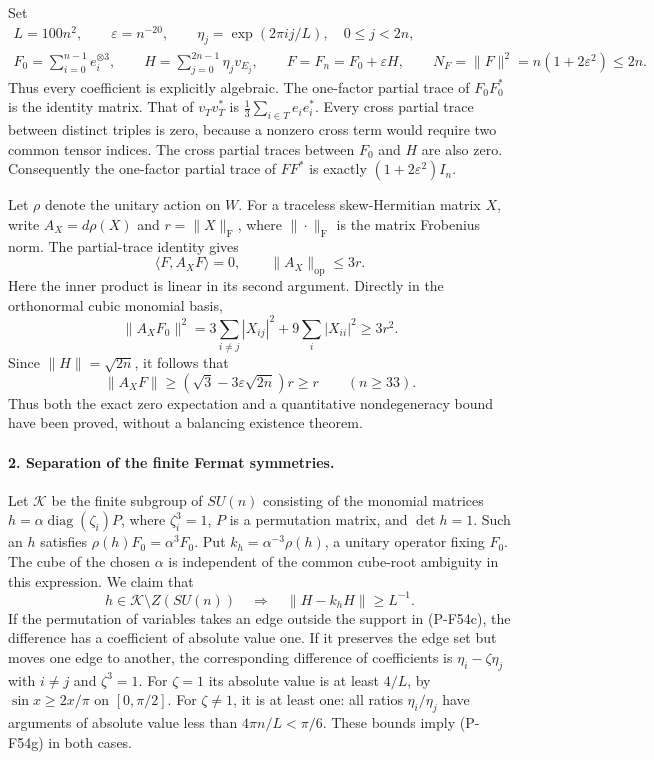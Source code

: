 Set
\[
 \begin{gathered}
 L=100n^2,\qquad \varepsilon=n^{-20},\qquad
 \eta_j=\exp(2\pi i j/L),\quad0\le j<2n,\\
 F_0=\sum_{i=0}^{n-1}e_i^{\otimes3},\qquad
 H=\sum_{j=0}^{2n-1}\eta_jv_{E_j},\qquad
 F=F_n=F_0+\varepsilon H,\qquad
 N_F=\|F\|^2=n(1+2\varepsilon^2)\le2n.
 \end{gathered}                                                   \tag{P-F54d}
\]
Thus every coefficient is explicitly algebraic. The one-factor
partial trace of $F_0F_0^*$ is the identity matrix. That of
$v_Tv_T^*$ is $\frac13\sum_{i\in T}e_ie_i^*$.
Every cross partial trace between distinct triples is zero,
because a nonzero cross term would require two common tensor
indices. The cross partial traces between $F_0$ and $H$ are
also zero. Consequently the one-factor partial trace of $FF^*$
is exactly $(1+2\varepsilon^2)I_n$.

Let $\rho$ denote the unitary action on $W$. For a traceless
skew-Hermitian matrix $X$, write $A_X=d\rho(X)$ and
$r=\|X\|_{\mathrm F}$, where $\|\cdot\|_{\mathrm F}$ is the
matrix Frobenius norm. The partial-trace identity gives
\[
       \langle F,A_XF\rangle=0,
       \qquad \|A_X\|_{\mathrm{op}}\le3r.                    \tag{P-F54e}
\]
Here the inner product is linear in its second argument.
Directly in the orthonormal cubic monomial basis,
\[
 \|A_XF_0\|^2
   =3\sum_{i\ne j}|X_{ij}|^2+9\sum_i|X_{ii}|^2
   \ge3r^2.
\]
Since $\|H\|=\sqrt{2n}$, it follows that
\[
 \|A_XF\|\ge(\sqrt3-3\varepsilon\sqrt{2n})r\ge r
                        \qquad(n\ge33).                      \tag{P-F54f}
\]
Thus both the exact zero expectation and a quantitative
nondegeneracy bound have been proved, without a balancing
existence theorem.

\paragraph{2. Separation of the finite Fermat symmetries.}
Let $\mathcal K$ be the finite subgroup of $SU(n)$ consisting of
the monomial matrices
$h=\alpha\operatorname{diag}(\zeta_i)P$, where
$\zeta_i^3=1$, $P$ is a permutation matrix, and $\det h=1$.
Such an $h$ satisfies $\rho(h)F_0=\alpha^3F_0$.
Put $k_h=\alpha^{-3}\rho(h)$, a unitary operator fixing $F_0$.
The cube of the chosen $\alpha$ is independent of the common
cube-root ambiguity in this expression.
We claim that
\[
       h\in\mathcal K\setminus Z(SU(n))
       \quad\Longrightarrow\quad
                  \|H-k_hH\|\ge L^{-1}.                     \tag{P-F54g}
\]
If the permutation of variables takes an edge outside the
support in (P-F54c), the difference has a coefficient of
absolute value one. If it preserves the edge set but moves
one edge to another, the corresponding difference of
coefficients is $\eta_i-\zeta\eta_j$ with $i\ne j$ and
$\zeta^3=1$. For $\zeta=1$ its absolute value is at least
$4/L$, by $\sin x\ge2x/\pi$ on $[0,\pi/2]$.
For $\zeta\ne1$, it is at least one: all ratios
$\eta_i/\eta_j$ have arguments of absolute value less than
$4\pi n/L<\pi/6$. These bounds imply (P-F54g) in both cases.

